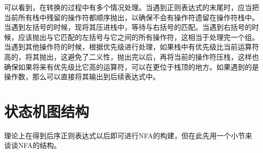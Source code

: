 可以看到，在转换的过程中有多个情况处理。当遇到正则表达式的末尾时，应当把当前所有栈中残留的操作符都顺序抛出，以确保不会有操作符遗留在操作符栈中。当遇到左括号的时候，现将其压进栈中，等待与右括号的匹配。当遇到右括号的时候，应该抛出与它匹配的左括号与它之间的所有操作符，这相当于处理完一个组。当遇到其他操作符的时候，根据优先级进行处理，如果栈中有优先级比当前运算符高的，将其抛出，这避免了二义性，抛出完以后，再将当前的操作符压栈，这样也确保如果将来有优先级比它高的运算符，可以在更位于栈顶的地方。如果遇到的是操作数，那么可以直接将其输出到后续表达式中。


\section{状态机图结构}

理论上在得到后序正则表达式以后即可进行NFA的构建，但在此先用一个小节来谈谈NFA的结构。
